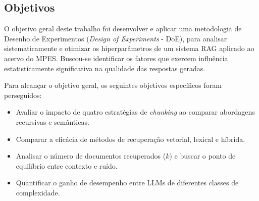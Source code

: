 \subsection{Objetivos}

O objetivo geral deste trabalho foi desenvolver e aplicar uma metodologia de Desenho de Experimentos (\textit{Design of Experiments} - DoE), para analisar sistematicamente e otimizar os hiperparâmetros de um sistema RAG aplicado ao acervo do MPES. Buscou-se identificar os fatores que exercem influência estatisticamente significativa na qualidade das respostas geradas.

Para alcançar o objetivo geral, os seguintes objetivos específicos foram perseguidos:
\begin{itemize}
  \item Avaliar o impacto de quatro estratégias de \textit{chunking} ao comparar abordagens recursivas e semânticas.
  \item Comparar a eficácia de métodos de recuperação vetorial, lexical e híbrida.
  \item Analisar o número de documentos recuperados ($k$) e buscar o ponto de equilíbrio entre contexto e ruído.
  \item Quantificar o ganho de desempenho entre LLMs de diferentes classes de complexidade.
\end{itemize}
